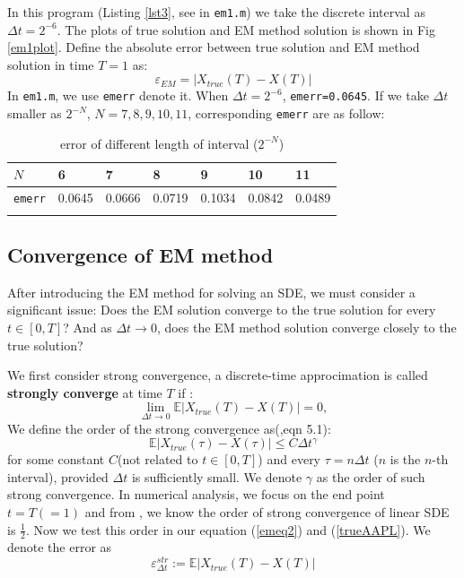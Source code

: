 \documentclass[12pt,a4paper]{article}
\theoremstyle{definition}
\begin{document}
In this program (Listing \ref{lst3}, see in \verb|em1.m|) we take the discrete interval as $\Delta t = 2^{-6}$. The plots of true solution and EM method solution is shown in Fig \ref{em1plot}. Define the absolute error between true solution and EM method solution in time $T=1$ as:\begin{equation}
    \label{emerreq}\varepsilon_{EM}=|X_{true}(T)-X(T)|
\end{equation}
In  \verb|em1.m|, we use \verb|emerr| denote it. When $\Delta t = 2^{-6}$, \verb|emerr=0.0645|. If we take $\Delta t$ smaller as $2^{-N}$, $N=7,8,9,10,11$, corresponding \verb|emerr| are as follow:
\begin{longtable}[c]{lllllll}
\hline
\textbf{$N$} & \textbf{6} & \textbf{7} & \textbf{8} & \textbf{9} & \textbf{10}&\textbf{11} \\ \hline
\endfirsthead
%
\endhead
%
\verb|emerr| &  0.0645 &   0.0666  &  0.0719  &  0.1034 &   0.0842 &   0.0489\\ \hline
\caption{error of different length of interval ($2^{-N}$)}
\label{tab:my-table}\\
\end{longtable}


\subsection{Convergence of EM method}
After introducing the EM method for solving an SDE, we must consider a significant issue: Does the EM solution converge to the true solution for every $t\in [0,T]$? And as $\Delta t \to 0$, does the EM method solution converge closely to the true solution?

We first consider strong convergence, a discrete-time approcimation is called \textbf{strongly converge} at time $T$ if \cite{sauer}:$$
\lim_{\Delta t\to 0}\mathbb{E}|X_{true}(T)-X(T)|=0,
$$ 
We define the order of the strong convergence as(\cite{higham._2001},eqn 5.1):
\begin{equation}
    \label{strcon} \mathbb{E}|X_{true}(\tau)-X(\tau)|\le C\Delta t^\gamma
\end{equation}
for some constant $C$(not related to $t\in [0,T]$) and every $\tau = n\Delta t$ ($n$ is the $n$-th interval), provided $\Delta t$ is sufficiently small. We denote $\gamma$ as the order of such strong convergence. In numerical analysis, we focus on the end point $t=T(=1)$ and from \cite{higham._2001}, we know the order of strong convergence of linear SDE is $\frac{1}{2}$. Now we test this order in our equation (\ref{emeq2}) and (\ref{trueAAPL}). We denote the error as\begin{equation}
    \label{emerr}\varepsilon^{str}_{\Delta t}:=\mathbb{E}|X_{true}(T)-X(T)|
\end{equation}
\end{document}

